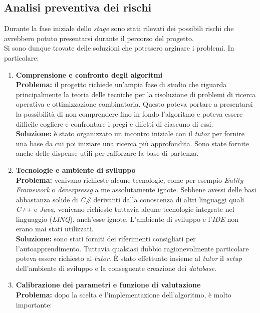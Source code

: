 \subsection{Analisi preventiva dei rischi}
\noindent Durante la fase iniziale dello \textit{stage} sono stati rilevati dei possibili rischi che avrebbero potuto presentarsi
durante il percorso del progetto.\\
Si sono dunque trovate delle soluzioni che potessero arginare i problemi. In particolare:
\begin{enumerate}
    \item \textbf{Comprensione e confronto degli algoritmi}\\[0.2cm]
    \textbf{Problema:} il progetto richiede un'ampia fase di studio che riguarda principalmente la teoria
    delle tecniche per la risoluzione di problemi di ricerca operativa e ottimizzazione combinatoria.
    Questo poteva portare a presentarsi la possibilità di non comprendere fino in fondo l'algoritmo e poteva essere difficile cogliere e confrontare
    i pregi e difetti di ciascuno di essi.\\[0.2cm]
    \textbf{Soluzione:} è stato organizzato un incontro iniziale con il \textit{tutor}
    per fornire una base da cui poi iniziare una ricerca più approfondita.
    Sono state fornite anche delle dispense utili per rafforzare la base di partenza.
    \item \textbf{Tecnologie e ambiente di sviluppo}\\[0.2cm]
    \textbf{Problema:} venivano richieste alcune tecnologie, come per esempio \textit{Entity Framework} o
    \textit{\gls{devexpressg}} a me assolutamente ignote.
    Sebbene avessi delle basi abbastanza solide di \textit{C\#} derivanti dalla conoscenza di altri linguaggi
    quali \textit{C++} e \textit{Java}, venivano richieste tuttavia
    alcune tecnologie integrate nel linguaggio (\textit{LINQ}), anch'esse ignote. L'ambiente di sviluppo e
    l'\textit{IDE} non erano mai stati utilizzati.\\[0.2cm]
    \textbf{Soluzione:} sono stati forniti dei riferimenti consigliati per l'autoapprendimento.
    Tuttavia qualsiasi dubbio ragionevolmente particolare
    poteva essere richiesto al \textit{tutor}. È stato effettuato insieme al \textit{tutor} il \textit{setup} dell'ambiente di sviluppo e la conseguente creazione dei \textit{database}.
    \item \textbf{Calibrazione dei parametri e funzione di valutazione}\\[0.2cm]
    \textbf{Problema:} dopo la scelta e l'implementazione dell'algoritmo, è molto importante:

\end{enumerate}
